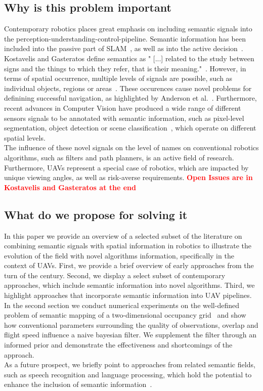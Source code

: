 \documentclass[twocolumn,letterpaper]{IEEEAerospaceCLS}  %
\newcommand\todo[1]{\textbf{\textcolor{red}{#1}}}
\begin{document}
\subsection{Why is this problem important}
Contemporary robotics places great emphasis on including semantic signals into the perception-understanding-control-pipeline. Semantic information has been included into the passive part of SLAM~\cite{cadena_past_2016,zhang_hierarchical_2019}, as well as into the active decision~\cite{koch_automatic_2019,alirezaie_exploiting_2017}. Kostavelis and Gasteratos define semantics as " [...] related to the study between signs and the things to which they refer, that is their meaning."~\cite{kostavelis_semantic_2015}. However, in terms of spatial occurrence, multiple levels of signals are possible, such as individual objects, regions or areas~\cite{kostavelis_semantic_2015}. These occurences cause novel problems for definining successful navigation, as highlighted by Anderson et al.~\cite{anderson_evaluation_2018}. Furthermore, recent advances in Computer Vision have produced a wide range of different sensors signals to be annotated with semantic information, such as pixel-level segmentation, object detection or scene classification~\cite{alom_history_2018}, which operate on different spatial levels.\\
The influence of these novel signals on the level of names on conventional robotics algorithms, such as filters and path planners, is an active field of research. Furthermore, UAVs represent a special case of robotics, which are impacted by unique viewing angles, as well as risk-averse requirements.
\todo{Open Issues are in Kostavelis and Gasteratos at the end}
\subsection{What do we propose for solving it}
In this paper we provide an overview of a selected subset of the literature on combining semantic signals with spatial information in robotics to illustrate the evolution of the field with novel algorithms information, specifically in the context of UAVs. First, we provide a brief overview of early approaches from the turn of the century. Second, we display a select subset of contemporary approaches, which include semantic information into novel algorithms. Third, we highlight approaches that incorporate semantic information into UAV pipelines.\\
In the second section we conduct numerical experiments on the well-defined problem of semantic mapping of a two-dimensional occupancy grid~\cite{gonzalez_unmanned_2016} and show how conventional parameters surrounding the quality of observations, overlap and flight speed influence a naive bayesian filter. We supplement the filter through an informed prior and demonstrate the effectiveness and shortcomings of the approach.\\
As a future prospect, we briefly point to approaches from related semantic fields, such as speech recognition and language processing, which hold the potential to enhance the inclusion of semantic information~\cite{lienou_semantic_2010}.
\end{document}
